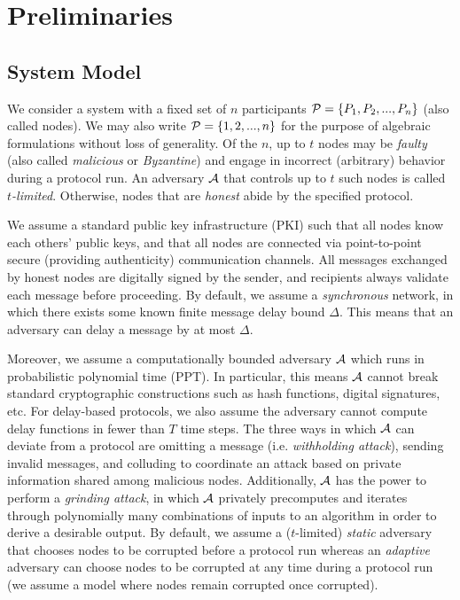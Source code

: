 
\section{Preliminaries}
\label{section:preliminaries}
\subsection{System Model}
We consider a system with a fixed set of $n$ participants $\mathcal{P} = \{P_1, P_2, ..., P_n\}$ (also called nodes).
We may also write $\mathcal{P} = \{1, 2, ..., n\}$ for the purpose of algebraic formulations without loss of generality.
Of the $n$, up to $t$ nodes may be \emph{faulty} (also called \textit{malicious} or \textit{Byzantine}) and engage in incorrect (arbitrary) behavior during a protocol run. An adversary $\mathcal{A}$ that controls up to $t$ such nodes is called \textit{$t$-limited}. Otherwise, nodes that are \textit{honest} abide by the specified protocol.

We assume a standard public key infrastructure (PKI) such that all nodes know each others' public keys, and that all nodes are connected via point-to-point secure (providing authenticity) communication channels. All messages exchanged by honest nodes are digitally signed by the sender, and recipients always validate each message before proceeding. By default, we assume a \textit{synchronous} network, in which there exists some known finite message delay bound $\Delta$. This means that an adversary can delay a message by at most $\Delta$.

Moreover, we assume a computationally bounded adversary $\mathcal{A}$ which runs in probabilistic polynomial time (PPT). In particular, this means $\mathcal{A}$ cannot break standard cryptographic constructions such as hash functions, digital signatures, etc.
For delay-based protocols, we also assume the adversary cannot compute delay functions in fewer than $T$ time steps.
The three ways in which $\mathcal{A}$ can deviate from a protocol are omitting a message (i.e. \textit{withholding attack}), sending invalid messages, and colluding to coordinate an attack based on private information shared among malicious nodes. Additionally, $\mathcal{A}$ has the power to perform a \textit{grinding attack}, in which $\mathcal{A}$ privately precomputes and iterates through polynomially many combinations of inputs to an algorithm in order to derive a desirable output. By default, we assume a ($t$-limited) \textit{static} adversary that chooses nodes to be corrupted before a protocol run whereas an \textit{adaptive} adversary can choose nodes to be corrupted at any time during a protocol run (we assume a model where nodes remain corrupted once corrupted).

